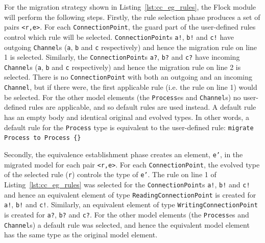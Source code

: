 For the migration strategy shown in Listing~\ref{lst:cc_eg_rules}, the Flock module will perform the following steps. Firstly, the rule selection phase produces a set of pairs \texttt{<r,e>}. For each \texttt{ConnectionPoint}, the guard part of the user-defined rules control which rule will be selected. \texttt{ConnectionPoint}s \texttt{a!}, \texttt{b!} and \texttt{c!} have outgoing \texttt{Channel}s (\texttt{a}, \texttt{b} and \texttt{c} respectively) and hence the migration rule on line 1 is selected. Similarly, the \texttt{ConnectionPoint}s \texttt{a?}, \texttt{b?} and \texttt{c?} have incoming \texttt{Channel}s (\texttt{a}, \texttt{b} and \texttt{c} respectively) and hence the migration rule on line 2 is selected. There is no \texttt{ConnectionPoint} with both an outgoing and an incoming \texttt{Channel}, but if there were, the first applicable rule (i.e. the rule on line 1) would be selected. For the other model elements (the \texttt{Process}es and \texttt{Channel}s) no user-defined rules are applicable, and so default rules are used instead. A default rule has an empty body and identical original and evolved types. In other words, a default rule for the \texttt{Process} type is equivalent to the user-defined rule: \texttt{migrate Process to Process \{\}}

Secondly, the equivalence establishment phase creates an element, \texttt{e'}, in the migrated model for each pair \texttt{<r,e>}. For each \texttt{ConnectionPoint}, the evolved type of the selected rule (\texttt{r}) controls the type of \texttt{e'}. The rule on line 1 of Listing~\ref{lst:cc_eg_rules} was selected for the \texttt{ConnectionPoint}s \texttt{a!}, \texttt{b!} and \texttt{c!} and hence an equivalent element of type \texttt{ReadingConnectionPoint} is created for \texttt{a!}, \texttt{b!} and \texttt{c!}. Similarly, an equivalent element of type \texttt{WritingConnectionPoint} is created for \texttt{a?}, \texttt{b?} and \texttt{c?}. For the other model elements (the \texttt{Process}es and \texttt{Channel}s) a default rule was selected, and hence the equivalent model element has the same type as the original model element.

